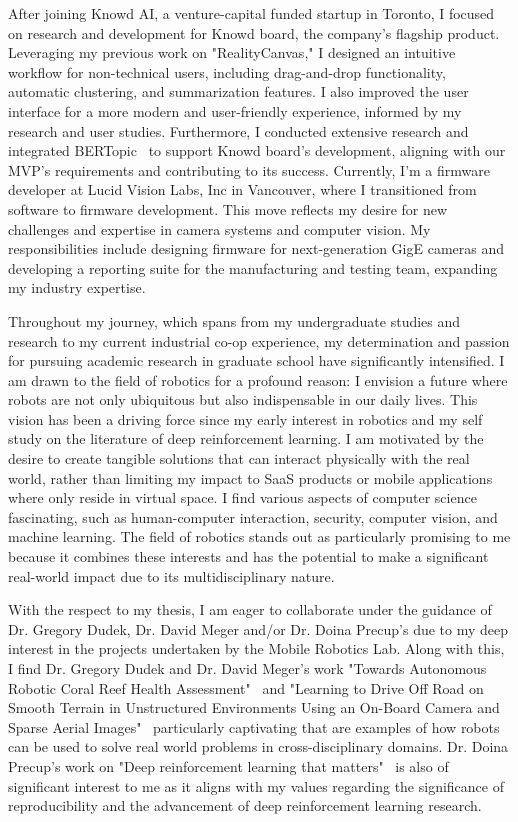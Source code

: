 \documentclass{article}
\begin{document}
After joining Knowd AI, a venture-capital funded startup in Toronto, 
I focused on research and development for Knowd board, the company's flagship product.
Leveraging my previous work on "RealityCanvas," I designed an intuitive workflow for non-technical users, 
including drag-and-drop functionality, automatic clustering, and summarization features. 
I also improved the user interface for a more modern and user-friendly experience, 
informed by my research and user studies.
Furthermore, I conducted extensive research and integrated 
BERTopic~\cite{BERT} to support Knowd board's development, aligning 
with our MVP's requirements and contributing to its success. 
Currently, I'm a firmware developer at Lucid Vision Labs, Inc in Vancouver, 
where I transitioned from software to firmware development. This move reflects 
my desire for new challenges and expertise in camera systems and computer vision. 
My responsibilities include designing firmware for next-generation GigE cameras and 
developing a reporting suite for the manufacturing and testing team, expanding my industry expertise.


Throughout my journey, which spans from my undergraduate studies and research to my current 
industrial co-op experience, my determination and passion for pursuing academic research in graduate school 
have significantly intensified. I am drawn to the field of robotics for a profound reason: I envision a future 
where robots are not only ubiquitous but also indispensable in our daily lives. This vision has been a 
driving force since my early interest in robotics and my self study on the literature of deep reinforcement 
learning. I am motivated by the desire to create tangible 
solutions that can interact physically with the real world, rather than 
limiting my impact to SaaS products or mobile applications where only reside in virtual space.
I find various aspects of computer science fascinating, such as human-computer interaction, security, 
computer vision, and machine learning. The field of robotics stands out as particularly promising to me 
because it combines these interests and has the potential to make a significant real-world impact due to 
its multidisciplinary nature.


With the respect to my thesis, I am eager to collaborate under the guidance of 
Dr. Gregory Dudek, Dr. David Meger and/or Dr. Doina Precup's due to my deep interest in the projects undertaken by 
the Mobile Robotics Lab. Along with this, I find Dr. Gregory Dudek
and Dr. David Meger's work "Towards Autonomous Robotic Coral Reef Health Assessment"~\cite{manderson2016towards}
and "Learning to Drive Off Road on Smooth Terrain in Unstructured Environments Using an On-Board Camera and Sparse Aerial Images"~\cite{manderson2020learning}
particularly captivating that are examples of how robots can be used to solve real world problems in cross-disciplinary domains.
Dr. Doina Precup's work on "Deep reinforcement learning that matters"~\cite{henderson2018deep} is also of 
significant interest to me as it aligns with my values regarding the significance of reproducibility 
and the advancement of deep reinforcement learning research.
\end{document}
